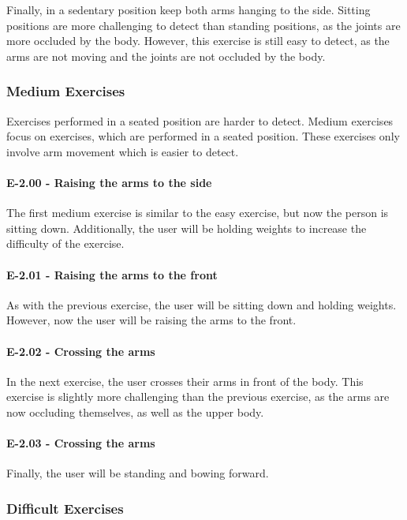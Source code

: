 Finally, in a sedentary position keep both arms hanging to the side. Sitting positions are more challenging to detect than standing positions, as the joints are more occluded by the body. However, this exercise is still easy to detect, as the arms are not moving and the joints are not occluded by the body.

\subsubsection{Medium Exercises}

Exercises performed in a seated position are harder to detect. Medium exercises focus on exercises, which are performed in a seated position. These exercises only involve arm movement which is easier to detect.

\paragraph{E-2.00 - Raising the arms to the side}

The first medium exercise is similar to the easy exercise, but now the person is sitting down. Additionally, the user will be holding weights to increase the difficulty of the exercise.

\paragraph{E-2.01 - Raising the arms to the front}

As with the previous exercise, the user will be sitting down and holding weights. However, now the user will be raising the arms to the front. 

\paragraph{E-2.02 - Crossing the arms}

 In the next exercise, the user crosses their arms in front of the body. This exercise is slightly more challenging than the previous exercise, as the arms are now occluding themselves, as well as the upper body.

\paragraph{E-2.03 - Crossing the arms}

Finally, the user will be standing and bowing forward. 

\subsubsection{Difficult Exercises}

